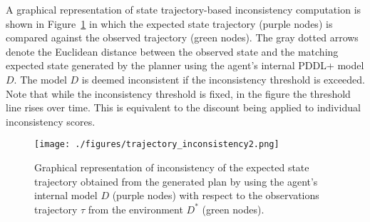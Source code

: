 \documentclass[letterpaper]{article} %
\newcommand{\sbirds}{Science Birds\xspace} %
\newcommand{\roni}[1]{{\textcolor{green}{[Roni: #1]}}}
\begin{document}
A graphical representation of state trajectory-based inconsistency computation is shown in Figure~\ref{fig:inconsistency_trajectory} in which the expected state trajectory (purple nodes) is compared against the observed trajectory (green nodes). The gray dotted arrows denote the Euclidean distance between the observed state and the matching expected state generated by the planner using the agent's internal PDDL+ model $D$. The model $D$ is deemed inconsistent if the inconsistency threshold is exceeded. Note that while the inconsistency threshold is fixed, in the figure the threshold line rises over time. This is equivalent to the discount being applied to individual inconsistency scores. 





\begin{figure}
	\centering
	\texttt{[image: ./figures/trajectory\_inconsistency2.png]}
	\caption{Graphical representation of inconsistency of the expected state trajectory obtained from the generated plan by using the agent's internal model $D$ (purple nodes) with respect to the observations trajectory $\tau$ from the environment $D^*$ (green nodes).}
	\label{fig:inconsistency_trajectory}
\end{figure}

\end{document}
